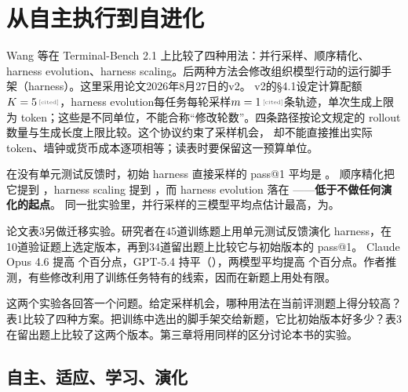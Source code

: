 \chapter{从自主执行到自进化}
\label{ch01}


\begin{failurebox}
Wang 等在 Terminal-Bench 2.1 上比较了四种用法：并行采样、顺序精化、harness evolution、harness scaling。后两种方法会修改组织模型行动的运行脚手架（harness）。这里采用论文2026年8月27日的v2\cite{harness-eval-2607}。
v2的§4.1设定计算配额$K=\cited{5}$，harness evolution每任务每轮采样$m=\cited{1}$条轨迹，单次生成上限为 token；这些是不同单位，不能合称“修改轮数”。四条路径按论文规定的 rollout 数量与生成长度上限比较。这个协议约束了采样机会，
却不能直接推出实际 token、墙钟或货币成本逐项相等；读表时要保留这一预算单位。

在没有单元测试反馈时，初始 harness 直接采样的 pass@1 平均是 。
顺序精化把它提到 ，harness scaling 提到 ，而 harness evolution 落在 ——\textbf{低于不做任何演化的起点}。
同一批实验里，并行采样的三模型平均点估计最高，为。

论文表3另做迁移实验。研究者在45道训练题上用单元测试反馈演化 harness，在10道验证题上选定版本，再到34道留出题上比较它与初始版本的 pass@1。
Claude Opus 4.6 提高  个百分点，GPT-5.4 持平（），两模型平均提高  个百分点。作者推测，有些修改利用了训练任务特有的线索，因而在新题上用处有限。
\end{failurebox}


这两个实验各回答一个问题。给定采样机会，哪种用法在当前评测题上得分较高？表1比较了四种方案。把训练中选出的脚手架交给新题，它比初始版本好多少？表3在留出题上比较了这两个版本。第三章将用同样的区分讨论本书的实验。

\section{自主、适应、学习、演化}

